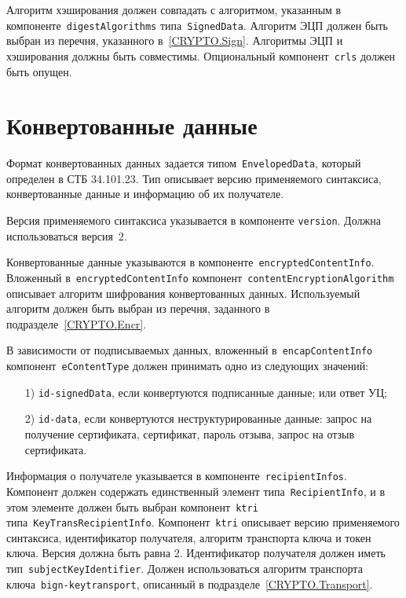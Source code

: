 Алгоритм хэширования должен
совпадать с алгоритмом, указанным в компоненте~\texttt{digestAlgorithms}
типа~\texttt{SignedData}. Алгоритм ЭЦП должен быть выбран из перечня,
указанного в~\ref{CRYPTO.Sign}. Алгоритмы ЭЦП и хэширования должны быть
совместимы. Опциональный компонент~\texttt{crls} должен быть опущен.

\section{Конвертованные данные}\label{FMT.EnvelopedData}

Формат конвертованных данных задается типом~\texttt{EnvelopedData}, который
определен в СТБ 34.101.23. Тип описывает версию применяемого синтаксиса,
конвертованные данные и информацию об их получателе.

Версия применяемого синтаксиса указывается в компоненте
\texttt{version}. Должна использоваться версия~$2$.

Конвертованные данные указываются в компоненте~\texttt{encryptedContentInfo}.
%
Вложенный в~\texttt{encryptedContentInfo} компонент~\texttt{contentEncryptionAlgorithm}
описывает алгоритм шифрования конвертованных данных. Используемый алгоритм 
должен быть выбран из перечня, заданного в подразделе~\ref{CRYPTO.Encr}.

В зависимости от подписываемых данных, вложенный 
в~\texttt{encapContentInfo} компонент~\texttt{eContentType} 
должен принимать одно из следующих значений:
\begin{enumerate}
\item[1)]
\texttt{id-signedData}, если конвертуются подписанные данные;
или ответ УЦ; 
\item[2)]
\texttt{id-data}, если конвертуются неструктурированные данные:
запрос на получение сертификата,
сертификат, пароль отзыва, запрос на отзыв сертификата. 
\end{enumerate}

Информация о получателе указывается в компоненте~\texttt{recipientInfos}.
Компонент должен содержать единственный элемент 
типа~\texttt{RecipientInfo}, и в этом элементе должен быть выбран  
компонент~\texttt{ktri} типа~\texttt{KeyTransRecipientInfo}.  
Компонент~\texttt{ktri} описывает версию применяемого синтаксиса, 
идентификатор получателя, алгоритм транспорта ключа и токен ключа. 
Версия должна быть равна 2. Идентификатор получателя должен 
иметь тип~\texttt{subjectKeyIdentifier}. Должен использоваться алгоритм 
транспорта ключа~\texttt{bign-keytransport}, описанный в 
подразделе~\ref{CRYPTO.Transport}.